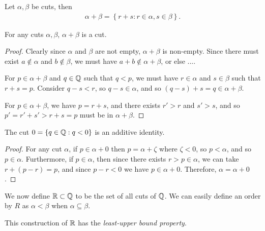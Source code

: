 \begin{defn}
    Let $\alpha, \beta$ be cuts, then
    \begin{align*}
        \alpha + \beta = \left\{r + s : r \in \alpha, s \in \beta\right\}.
    \end{align*}
\end{defn}

\begin{prop}
    For any cuts $\alpha, \beta$, $\alpha+\beta$ is a cut.
\end{prop}

\begin{proof}
    Clearly since $\alpha$ and $\beta$ are not empty, $\alpha+\beta$ is non-empty. Since there must exist $a \not\in \alpha$ and $b \not\in \beta$, we must have $a+b\not\in \alpha+\beta$, or else ....

    For $p \in \alpha+\beta$ and $q \in \mathbb{Q}$ such that $q < p$, we must have $r\in\alpha$ and $s\in\beta$ such that $r+s = p$. Consider $q - s < r$, so $q-s \in\alpha$, and so $(q-s)+s = q \in \alpha+\beta$.

    For $p \in \alpha+\beta$, we have $p = r+s$, and there exists $r'>r$ and $s'>s$, and so $p' = r'+s' > r+s = p$ must be in $\alpha+\beta$.
\end{proof}

\begin{prop}
    The cut $0 = \{q \in \mathbb{Q} : q < 0\}$ is an additive identity.
\end{prop}

\begin{proof}
    For any cut $\alpha$, if $p \in \alpha+0$ then $p = \alpha + \zeta$ where $\zeta < 0$, so $p < \alpha$, and so $p \in \alpha$. Furthermore, if $p \in \alpha$, then since there exists $r > p \in \alpha$, we can take $r + (p - r) = p$, and since $p - r < 0$ we have $p \in \alpha + 0$. Therefore, $\alpha = \alpha + 0$.
\end{proof}

We now define $\mathbb{R} \subset \mathcal{\mathbb{Q}}$ to be the set of all cuts of $\mathbb{Q}$. We can easily define an order by $R$ as $\alpha < \beta$ when $\alpha \subseteq \beta$.

\begin{thm}
    This construction of $\mathbb{R}$ has the \emph{least-upper bound property}.
\end{thm}

